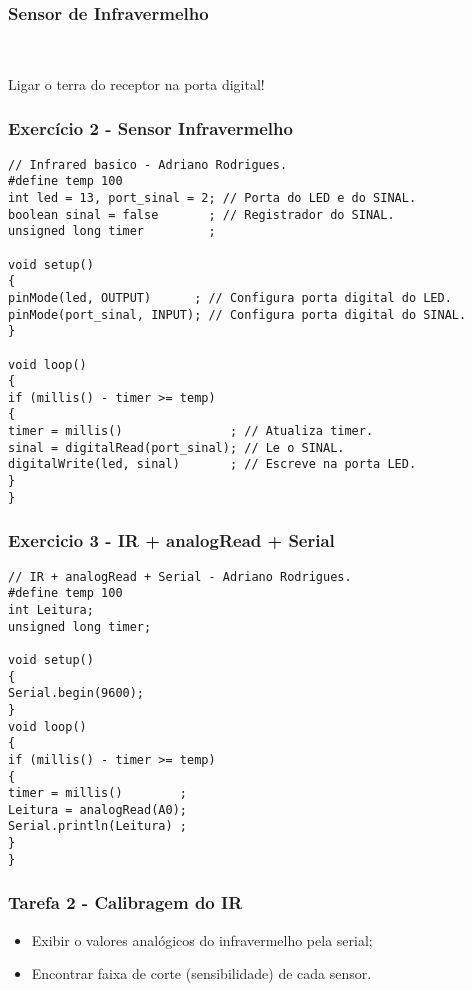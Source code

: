 \documentclass{beamer}
\begin{document}
\begin{frame}
	\frametitle{Sensor de Infravermelho}
	\begin{center}
		\\[20pt]
	\end{center}
	Ligar o terra do receptor na porta digital!
\end{frame}

\begin{frame}[fragile]
	\frametitle{Exercício 2 - Sensor Infravermelho}
	
	\begin{lstlisting}[style=Arduino,basicstyle=\scriptsize \ttfamily]
// Infrared basico - Adriano Rodrigues.
#define temp 100
int led = 13, port_sinal = 2; // Porta do LED e do SINAL.
boolean sinal = false       ; // Registrador do SINAL.
unsigned long timer         ;

void setup()
{
pinMode(led, OUTPUT)      ; // Configura porta digital do LED.
pinMode(port_sinal, INPUT); // Configura porta digital do SINAL.
}

void loop()
{
if (millis() - timer >= temp)
{
timer = millis()               ; // Atualiza timer.
sinal = digitalRead(port_sinal); // Le o SINAL.
digitalWrite(led, sinal)       ; // Escreve na porta LED.
}
}
\end{lstlisting}
\end{frame}

\begin{frame}[fragile]
	\frametitle{Exercicio 3 - IR + analogRead + Serial}
	\begin{lstlisting}[style=Arduino]
// IR + analogRead + Serial - Adriano Rodrigues.
#define temp 100
int Leitura;
unsigned long timer;

void setup()
{
Serial.begin(9600);
}
void loop()
{
if (millis() - timer >= temp)
{
timer = millis()        ;
Leitura = analogRead(A0);
Serial.println(Leitura) ;
}
}
\end{lstlisting}
\end{frame}

\begin{frame}[fragile]
	\frametitle{Tarefa 2 - Calibragem do IR}
	\begin{itemize}
	\item Exibir o valores analógicos do infravermelho pela serial;
	\item Encontrar faixa de corte (sensibilidade) de cada sensor.
	\end{itemize}
\end{frame}
\end{document}
